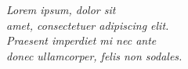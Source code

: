 \cleardoublepage
\thispagestyle{empty}
\begin{flushright}
\itshape Lorem ipsum, dolor sit \\
amet, consectetuer adipiscing elit.  \\ \vspace{5mm}
Praesent imperdiet mi nec ante \\
donec ullamcorper, felis non sodales.
\end{flushright}
\cleardoublepage